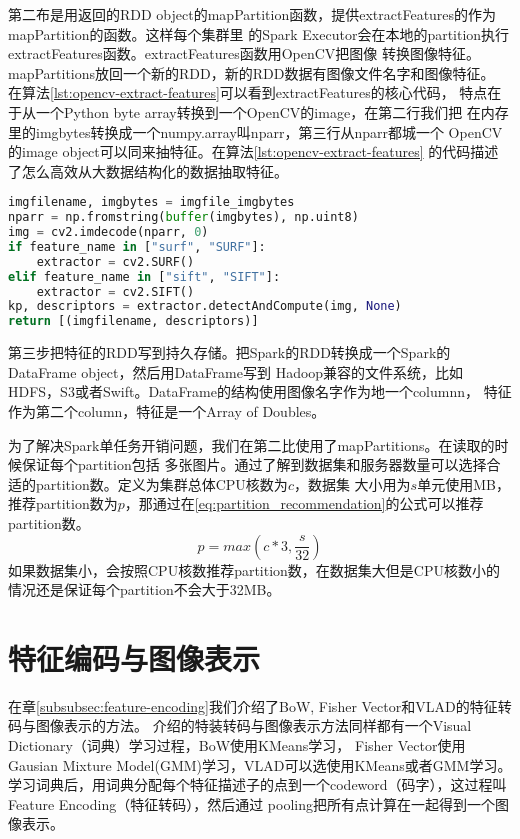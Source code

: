 第二布是用返回的RDD object的mapPartition函数，提供extractFeatures的作为mapPartition的函数。这样每个集群里
的Spark Executor会在本地的partition执行extractFeatures函数。extractFeatures函数用OpenCV把图像
转换图像特征。mapPartitions放回一个新的RDD，新的RDD数据有图像文件名字和图像特征。
在算法\ref{lst:opencv-extract-features}可以看到extractFeatures的核心代码，
特点在于从一个Python byte array转换到一个OpenCV的image，在第二行我们把
在内存里的imgbytes转换成一个numpy.array叫nparr，第三行从nparr都城一个
OpenCV的image object可以同来抽特征。在算法\ref{lst:opencv-extract-features}
的代码描述了怎么高效从大数据结构化的数据抽取特征。
\begin{lstlisting}[language=Python,
                   basicstyle=\small,
                   showstringspaces=false,
                   caption={OpenCV从内存读取图像抽取特征},
                   label={lst:opencv-extract-features}]
imgfilename, imgbytes = imgfile_imgbytes
nparr = np.fromstring(buffer(imgbytes), np.uint8)
img = cv2.imdecode(nparr, 0)
if feature_name in ["surf", "SURF"]:
    extractor = cv2.SURF()
elif feature_name in ["sift", "SIFT"]:
    extractor = cv2.SIFT()
kp, descriptors = extractor.detectAndCompute(img, None)
return [(imgfilename, descriptors)]
\end{lstlisting}

第三步把特征的RDD写到持久存储。把Spark的RDD转换成一个Spark的DataFrame object，然后用DataFrame写到
Hadoop兼容的文件系统，比如HDFS，S3或者Swift。DataFrame的结构使用图像名字作为地一个columnn，
特征作为第二个column，特征是一个Array of Doubles。

为了解决Spark单任务开销问题，我们在第二比使用了mapPartitions。在读取的时候保证每个partition包括
多张图片。通过了解到数据集和服务器数量可以选择合适的partition数。定义为集群总体CPU核数为$c$，数据集
大小用为$s$单元使用MB，推荐partition数为$p$，那通过在\ref{eq:partition_recommendation}的公式可以推荐partition数。
\begin{equation} \label{eq:partition_recommendation}
p = max(c * 3, \frac{s}{32})
\end{equation}
如果数据集小，会按照CPU核数推荐partition数，在数据集大但是CPU核数小的情况还是保证每个partition不会大于32MB。



\section{特征编码与图像表示}
\label{sec:image-representation}
在章\ref{subsubsec:feature-encoding}我们介绍了BoW, Fisher Vector和VLAD的特征转码与图像表示的方法。
介绍的特装转码与图像表示方法同样都有一个Visual Dictionary（词典）学习过程，BoW使用KMeans学习，
Fisher Vector使用Gausian Mixture Model(GMM)学习，VLAD可以选使用KMeans或者GMM学习。
学习词典后，用词典分配每个特征描述子的点到一个codeword（码字），这过程叫Feature Encoding（特征转码），然后通过
pooling把所有点计算在一起得到一个图像表示。

